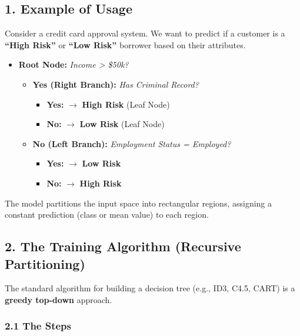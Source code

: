 \documentclass[
  italian,
  11pt,
]{article}
\begin{document}
\subsection{1. Example of Usage}\label{example-of-usage}

Consider a credit card approval system. We want to predict if a customer
is a \textbf{``High Risk''} or \textbf{``Low Risk''} borrower based on
their attributes.

\begin{itemize}
\item
  \textbf{Root Node:} \emph{Income \textgreater{} \$50k?}

  \begin{itemize}
  \item
    \textbf{Yes (Right Branch):} \emph{Has Criminal Record?}

    \begin{itemize}
    \item
      \textbf{Yes:} \(\rightarrow\) \textbf{High Risk} (Leaf Node)
    \item
      \textbf{No:} \(\rightarrow\) \textbf{Low Risk} (Leaf Node)
    \end{itemize}
  \item
    \textbf{No (Left Branch):} \emph{Employment Status = Employed?}

    \begin{itemize}
    \item
      \textbf{Yes:} \(\rightarrow\) \textbf{Low Risk}
    \item
      \textbf{No:} \(\rightarrow\) \textbf{High Risk}
    \end{itemize}
  \end{itemize}
\end{itemize}

The model partitions the input space into rectangular regions, assigning
a constant prediction (class or mean value) to each region.

\subsection{2. The Training Algorithm (Recursive
Partitioning)}\label{the-training-algorithm-recursive-partitioning}

The standard algorithm for building a decision tree (e.g., ID3, C4.5,
CART) is a \textbf{greedy top-down} approach.

\subsubsection{2.1 The Steps}\label{the-steps}
\end{document}
